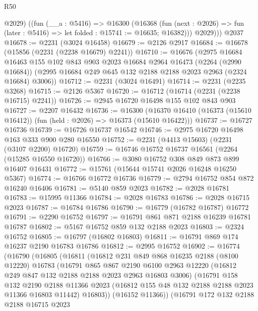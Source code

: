 \begin{lexlean}{R50}
\begin{coremodule}
          @2029)
        ((fun (__a : @5416) =>
        @16300
          (@16368
            (fun (next : @2026) => fun (later : @5416) => let folded : @15741 := @16635; @16382)))
          @2029)))
    @2037
@16678 := @2231 (@3024 @16458)
@16679 := @2126 @2917
@16684 := @16678 (@15856 (@2231 (@2238 @16679) @2241))
@16710 := @16676
    (@2975
      @16684
      @16463
      @155
      @102
      @843
      @903
      @2023
      @16684
      @2964
      @16473
      (@2264 (@2990 @16684))
      (@2995 @16684 @249 @645 @132 @2188 @2188 @2023 @2963 (@2324 @16684) @3006))
@16712 := @2231 (@3024 @16491)
@16714 := @2231 (@2235 @3268)
@16715 := @2126 @5367
@16720 := @16712 (@16714 (@2231 (@2238 @16715) @2241))
@16726 := @2945 @16720 @16498 @155 @102 @843 @903
@16727 := @2207 @16432
@16736 := @16300
    (@16370 @16410 (@16373 (@15610 @16412)) (fun (held : @2026) => @16373 (@15610 @16422)))
@16737 := @16727 @16736
@16739 := @16726 @16737 @16542
@16746 := @2975 @16720 @16498 @163 @333 @900 @280 @16550
@16752 := @2231 (@4413 @15603) (@2231 (@3107 @2200) @16720)
@16759 := @16746 @16752 @16737 @16561 (@2264 (@15285 @16550 @16720))
@16766 := @3080 @16752 @308 @849 @873 @899 @16407 @16431
@16772 := @15761 (@15644 @15741 @2026 @16248 @16250 @5367)
@16774 := @16766 @16772 @16736
@16779 := @2794 @16752 @854 @872 @16240 @16406
@16781 := @5140 @859 @2023
@16782 := @2028 @16781
@16783 := @15995 @11366
@16784 := @2028 @16783
@16786 := @2028 @16715 @2023
@16787 := @16784 @16786
@16790 := @16779 (@16782 @16787) @16772
@16791 := @2290 @16752
@16797 := @16791 @861 @871 @2188 @16239 @16781 @16787
@16802 := @5167 @16752 @859 @132 @2188 @2023
@16803 := @2324 @16752
@16805 := @16797 (@16802 @16803)
@16811 := @16791 @869 @174 @16237 @2190 @16783 @16786
@16812 := @2995 @16752
@16902 := @16774
    (@16790
      (@16805
        (@16811
          (@16812
            @231
            @849
            @868
            @16235
            @2188
            (@8100 @12220)
            @16783
            (@16791
              @865
              @867
              @2190
              @6100
              @2963
              @12220
              (@16812 @249 @847 @132 @2188 @2188 @2023 @2963 @16803 @3006)
              (@16791
                @158
                @132
                @2190
                @2188
                @11366
                @2023
                (@16812 @155 @48 @132 @2188 @2188 @2023 @11366 @16803 @11442)
                @16803))
            (@16152 @11366))
          (@16791
            @172
            @132
            @2188
            @2188
            @16715
            @2023

\end{coremodule}
\end{lexlean}
